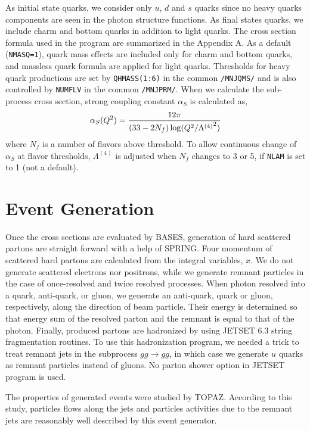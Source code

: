 As initial state quarks, we consider only $u$, $d$ and $s$ quarks
since no heavy quarks components are seen in the photon structure
functions. As final states quarks, we include charm and bottom quarks
in addition to light quarks. 
The cross section formula
used in the program are summarized in the Appendix A.
As a default ({\tt NMASQ=1}),
quark mass effects are included only for charm and bottom quarks,
and massless quark formula are applied for light quarks.
Thresholds for heavy quark productions are set by {\tt QHMASS(1:6)}
in the common {\tt /MNJQMS/} and is also controlled by {\tt NUMFLV} in
the common {\tt /MNJPRM/}.  When we calculate the sub-process cross 
section, strong coupling constant $\alpha_S$ is calculated as,
\begin{equation}
\alpha_S(Q^2)={12 \pi \over (33 - 2 N_f) \log(Q^2/{\Lambda^{(4)}}^2) }
\end{equation}
\noindent where $N_f$ is a number of flavors above threshold.
To allow continuous change of $\alpha_S$ at flavor thresholds,
$\Lambda^{(4)}$ is adjusted when $N_f$ changes to 3 or 5, if 
{\tt NLAM} is set to 1 (not a default).  



\section{Event Generation}
Once the cross sections are evaluated by BASES, generation  of 
hard scattered partons are straight forward 
with a help of SPRING.  Four momentum of scattered  hard partons
are calculated from the integral variables, $x$.  We do not generate
scattered electrons nor positrons, 
while we generate remnant particles in the case of once-resolved
and twice resolved processes.  
When photon resolved into 
a quark, anti-quark, or gluon, we generate 
an anti-quark, quark or gluon, respectively, along
the direction of beam particle.
Their energy is determined so that energy sum
of the resolved parton and the remnant is equal to 
that of the photon. 
Finally, produced partons are hadronized by using
JETSET 6.3\cite{LUND63} string fragmentation routines.
To use this hadronization program, we needed a trick to treat remnant
jets in the subprocess
$g g \rightarrow g g$, in which case we generate $u$ quarks as remnant
particles instead of gluons.
No parton shower option in JETSET program is used.

The properties of generated events were studied by
TOPAZ\cite{TOPAZ93B}.  According to this study,
particles flows along the jets and particles
activities due to the remnant jets are reasonably 
well described by this event generator.


